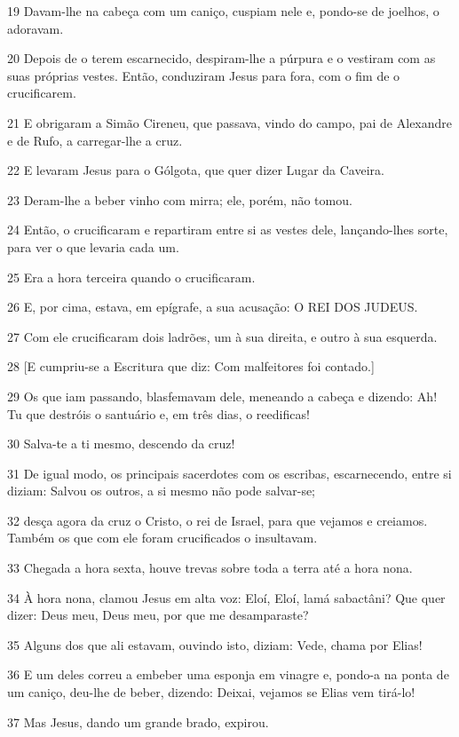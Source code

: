 \par 19 Davam-lhe na cabeça com um caniço, cuspiam nele e, pondo-se de joelhos, o adoravam.
\par 20 Depois de o terem escarnecido, despiram-lhe a púrpura e o vestiram com as suas próprias vestes. Então, conduziram Jesus para fora, com o fim de o crucificarem.
\par 21 E obrigaram a Simão Cireneu, que passava, vindo do campo, pai de Alexandre e de Rufo, a carregar-lhe a cruz.
\par 22 E levaram Jesus para o Gólgota, que quer dizer Lugar da Caveira.
\par 23 Deram-lhe a beber vinho com mirra; ele, porém, não tomou.
\par 24 Então, o crucificaram e repartiram entre si as vestes dele, lançando-lhes sorte, para ver o que levaria cada um.
\par 25 Era a hora terceira quando o crucificaram.
\par 26 E, por cima, estava, em epígrafe, a sua acusação: O REI DOS JUDEUS.
\par 27 Com ele crucificaram dois ladrões, um à sua direita, e outro à sua esquerda.
\par 28 [E cumpriu-se a Escritura que diz: Com malfeitores foi contado.]
\par 29 Os que iam passando, blasfemavam dele, meneando a cabeça e dizendo: Ah! Tu que destróis o santuário e, em três dias, o reedificas!
\par 30 Salva-te a ti mesmo, descendo da cruz!
\par 31 De igual modo, os principais sacerdotes com os escribas, escarnecendo, entre si diziam: Salvou os outros, a si mesmo não pode salvar-se;
\par 32 desça agora da cruz o Cristo, o rei de Israel, para que vejamos e creiamos. Também os que com ele foram crucificados o insultavam.
\par 33 Chegada a hora sexta, houve trevas sobre toda a terra até a hora nona.
\par 34 À hora nona, clamou Jesus em alta voz: Eloí, Eloí, lamá sabactâni? Que quer dizer: Deus meu, Deus meu, por que me desamparaste?
\par 35 Alguns dos que ali estavam, ouvindo isto, diziam: Vede, chama por Elias!
\par 36 E um deles correu a embeber uma esponja em vinagre e, pondo-a na ponta de um caniço, deu-lhe de beber, dizendo: Deixai, vejamos se Elias vem tirá-lo!
\par 37 Mas Jesus, dando um grande brado, expirou.
